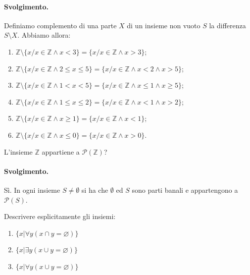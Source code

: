 \paragraph{Svolgimento.} Definiamo complemento di una parte $X$ di un insieme non vuoto $S$ la differenza $S \setminus X$. Abbiamo allora:
\begin{enumerate}
	\item $\mathbb{Z} \setminus \{x / x \in \mathbb{Z} \land x <3\} = \{x / x \in \mathbb{Z} \land x > 3\}$;
	\item $\mathbb{Z} \setminus \{x / x \in \mathbb{Z} \land 2 \leq x \leq 5 \} = \{x / x \in \mathbb{Z} \land x < 2 \land x > 5\}$;
	\item $\mathbb{Z} \setminus \{x / x \in \mathbb{Z} \land 1 < x < 5 \} = \{x / x \in \mathbb{Z} \land x \leq 1 \land x \geq 5\}$;
	\item $\mathbb{Z} \setminus \{x / x \in \mathbb{Z} \land 1 \leq x \leq 2 \} = \{x /  x \in \mathbb{Z} \land x < 1 \land x > 2\}$;
	\item $\mathbb{Z} \setminus \{x / x \in \mathbb{Z} \land x \geq 1 \} = \{x / x \in \mathbb{Z} \land x < 1 \}$;
	\item $\mathbb{Z} \setminus \{x / x \in \mathbb{Z} \land x \leq 0 \} = \{x / x \in \mathbb{Z} \land x > 0 \}$. \hfill \blacksquare
\end{enumerate}
\begin{exsbox}
	L'insieme $\mathbb{Z}$ appartiene a $\mathcal{P}(\mathbb{Z})$?
\end{exsbox}
\paragraph{Svolgimento.} Sì. In ogni insieme $S \neq \emptyset$ si ha che $\emptyset$ ed $S$ sono parti banali e appartengono a $\mathcal{P}(S)$. \hfill \blacksquare
\begin{exsbox}
	Descrivere esplicitamente gli insiemi:
	\begin{enumerate}
		\item $\{x | \forall y (x \cap y = \varnothing)\}$
		\item $\{x | \exists y (x \cup y = \varnothing)\}$
		\item $\{x | \forall y (x \cup y = \varnothing)\}$
	\end{enumerate}
\end{exsbox}
